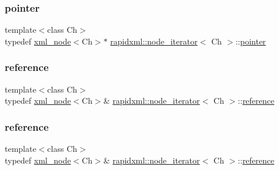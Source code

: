 \mbox{\label{classrapidxml_1_1node__iterator_a65dca8bca2b9c29f635b9ad0bdeeecb9}} 
\subsubsection{\texorpdfstring{pointer}{pointer}\hspace{0.1cm}{\footnotesize\ttfamily [2/2]}}
{\footnotesize\ttfamily template$<$class Ch$>$ \\
typedef \mbox{\hyperlink{classrapidxml_1_1xml__node}{xml\+\_\+node}}$<$Ch$>$$\ast$ \mbox{\hyperlink{classrapidxml_1_1node__iterator}{rapidxml\+::node\+\_\+iterator}}$<$ Ch $>$\+::\mbox{\hyperlink{classrapidxml_1_1node__iterator_a65dca8bca2b9c29f635b9ad0bdeeecb9}{pointer}}}

\mbox{\label{classrapidxml_1_1node__iterator_ad7fabbcb7d3d9e4e220299c5475b9e9c}} 
\subsubsection{\texorpdfstring{reference}{reference}\hspace{0.1cm}{\footnotesize\ttfamily [1/2]}}
{\footnotesize\ttfamily template$<$class Ch$>$ \\
typedef \mbox{\hyperlink{classrapidxml_1_1xml__node}{xml\+\_\+node}}$<$Ch$>$\& \mbox{\hyperlink{classrapidxml_1_1node__iterator}{rapidxml\+::node\+\_\+iterator}}$<$ Ch $>$\+::\mbox{\hyperlink{classrapidxml_1_1node__iterator_ad7fabbcb7d3d9e4e220299c5475b9e9c}{reference}}}

\mbox{\label{classrapidxml_1_1node__iterator_ad7fabbcb7d3d9e4e220299c5475b9e9c}} 
\subsubsection{\texorpdfstring{reference}{reference}\hspace{0.1cm}{\footnotesize\ttfamily [2/2]}}
{\footnotesize\ttfamily template$<$class Ch$>$ \\
typedef \mbox{\hyperlink{classrapidxml_1_1xml__node}{xml\+\_\+node}}$<$Ch$>$\& \mbox{\hyperlink{classrapidxml_1_1node__iterator}{rapidxml\+::node\+\_\+iterator}}$<$ Ch $>$\+::\mbox{\hyperlink{classrapidxml_1_1node__iterator_ad7fabbcb7d3d9e4e220299c5475b9e9c}{reference}}}

